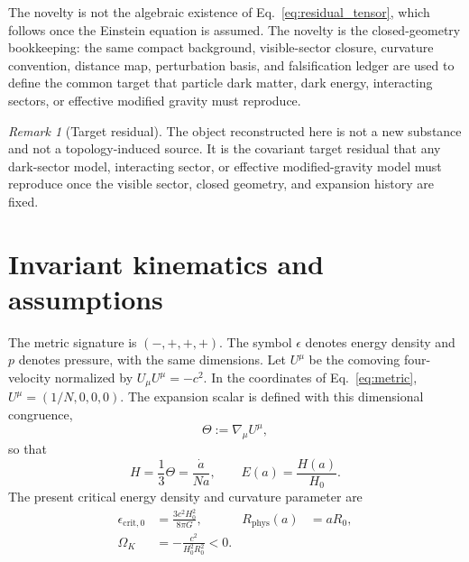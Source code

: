 \documentclass[
  aps,
  prd,
  reprint,
  superscriptaddress,
  nofootinbib,
  floatfix,
  longbibliography
]{revtex4-2}
\theoremstyle{plain}
\theoremstyle{definition}
\theoremstyle{remark}
\newtheorem{remark}[theorem]{Remark}
\newcommand{\Rphys}{R_{\mathrm{phys}}}
\newcommand{\crit}{\epsilon_{\mathrm{crit},0}}
\newcommand{\Omk}{\Omega_K}
\newcommand{\Thetaexp}{\Theta}
\begin{document}
The novelty is not the algebraic existence of Eq.~\eqref{eq:residual_tensor},
which follows once the Einstein equation is assumed.  The novelty is the
closed-geometry bookkeeping: the same compact background, visible-sector
closure, curvature convention, distance map, perturbation basis, and
falsification ledger are used to define the common target that particle dark
matter, dark energy, interacting sectors, or effective modified gravity must
reproduce.

\begin{remark}[Target residual]
The object reconstructed here is not a new substance and not a
topology-induced source.  It is the covariant target residual that any
dark-sector model, interacting sector, or effective modified-gravity model must
reproduce once the visible sector, closed geometry, and expansion history are
fixed.
\end{remark}

\section{Invariant kinematics and assumptions}

The metric signature is $(-,+,+,+)$.  The symbol $\epsilon$ denotes energy
density and $p$ denotes pressure, with the same dimensions.  Let $U^\mu$ be the
comoving four-velocity normalized by $U_\mu U^\mu=-c^2$.  In the coordinates of
Eq.~\eqref{eq:metric}, $U^\mu=(1/N,0,0,0)$.  The expansion scalar is defined
with this dimensional congruence,
\begin{equation}
\Thetaexp:=\nabla_\mu U^\mu ,
\label{eq:Theta}
\end{equation}
so that
\begin{equation}
H=\frac13\Thetaexp=\frac{\dot a}{Na}, \qquad E(a)=\frac{H(a)}{H_0}.
\label{eq:H_scalar}
\end{equation}
The present critical energy density and curvature parameter are
\begin{align}
\crit&=\frac{3c^2H_0^2}{8\pi G},&
\Rphys(a)&=aR_0,
\nonumber\\
\Omk&=-\frac{c^2}{H_0^2R_0^2}<0 .
\label{eq:ecrit_E}
\end{align}
\end{document}
